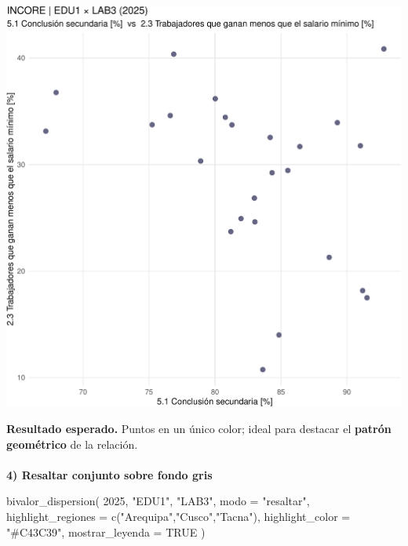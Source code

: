 \documentclass[
  11pt,
  letterpaper,
  DIV=11,
  numbers=noendperiod]{scrartcl}
\makeatletter
\let\oldparagraph\paragraph
\renewcommand{\paragraph}{
    \@ifstar
      \xxxParagraphStar
      \xxxParagraphNoStar
  }
\newcommand{\xxxParagraphStar}[1]{\oldparagraph*{#1}\mbox{}}
\newcommand{\xxxParagraphNoStar}[1]{\oldparagraph{#1}\mbox{}}
\newenvironment{Shaded}{\begin{snugshade}}{\end{snugshade}}
\newcommand{\AttributeTok}[1]{\textcolor[rgb]{0.40,0.45,0.13}{#1}}
\newcommand{\ConstantTok}[1]{\textcolor[rgb]{0.56,0.35,0.01}{#1}}
\newcommand{\DecValTok}[1]{\textcolor[rgb]{0.68,0.00,0.00}{#1}}
\newcommand{\FunctionTok}[1]{\textcolor[rgb]{0.28,0.35,0.67}{#1}}
\newcommand{\NormalTok}[1]{\textcolor[rgb]{0.00,0.23,0.31}{#1}}
\newcommand{\StringTok}[1]{\textcolor[rgb]{0.13,0.47,0.30}{#1}}
\makeatother
\begin{document}
\includegraphics{Manual_files/figure-pdf/unnamed-chunk-111-1.pdf}

\textbf{Resultado esperado.} Puntos en un único color; ideal para
destacar el \textbf{patrón geométrico} de la relación.

\paragraph{\texorpdfstring{\textbf{4) Resaltar conjunto sobre fondo
gris}}{4) Resaltar conjunto sobre fondo gris}}\label{resaltar-conjunto-sobre-fondo-gris}

\begin{Shaded}
\begin{Highlighting}[]
\FunctionTok{bivalor\_dispersion}\NormalTok{(}
  \DecValTok{2025}\NormalTok{, }\StringTok{"EDU1"}\NormalTok{, }\StringTok{"LAB3"}\NormalTok{,}
  \AttributeTok{modo               =} \StringTok{"resaltar"}\NormalTok{,}
  \AttributeTok{highlight\_regiones =} \FunctionTok{c}\NormalTok{(}\StringTok{"Arequipa"}\NormalTok{,}\StringTok{"Cusco"}\NormalTok{,}\StringTok{"Tacna"}\NormalTok{),}
  \AttributeTok{highlight\_color    =} \StringTok{"\#C43C39"}\NormalTok{,}
  \AttributeTok{mostrar\_leyenda    =} \ConstantTok{TRUE}
\NormalTok{)}
\end{Highlighting}
\end{Shaded}
\end{document}
